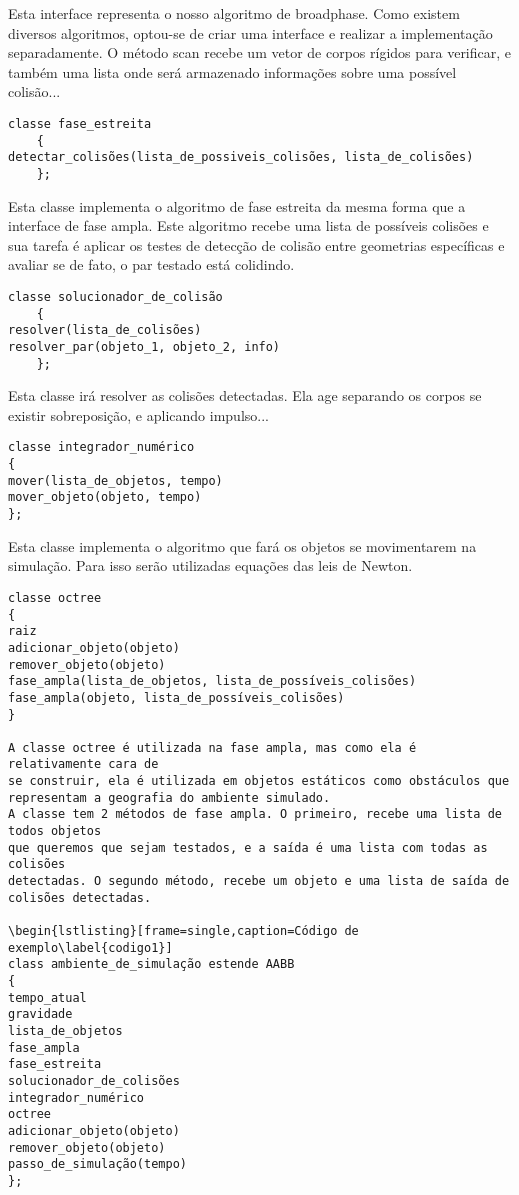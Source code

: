 Esta interface representa o nosso algoritmo de broadphase. Como existem
diversos algoritmos, optou-se de criar uma interface e realizar a implementação
separadamente.
O método scan recebe um vetor de corpos rígidos para verificar, e também uma
lista onde será armazenado informações sobre uma possível colisão...

\begin{lstlisting}[frame=single,caption=Código de exemplo\label{codigo1}]
classe fase_estreita
    {
detectar_colisões(lista_de_possiveis_colisões, lista_de_colisões)
    };
\end{lstlisting}

Esta classe implementa o algoritmo de fase estreita da mesma forma que a interface
de fase ampla. Este algoritmo recebe uma lista de possíveis colisões e sua
tarefa é aplicar os testes de detecção de colisão entre geometrias específicas
e avaliar se de fato, o par testado está colidindo.

\begin{lstlisting}[frame=single,caption=Código de exemplo\label{codigo1}]
classe solucionador_de_colisão
    {
resolver(lista_de_colisões)
resolver_par(objeto_1, objeto_2, info)
    };
\end{lstlisting}

Esta classe irá resolver as colisões detectadas. Ela age separando os corpos se
existir sobreposição, e aplicando impulso...

\begin{lstlisting}[frame=single,caption=Código de exemplo\label{codigo1}]
classe integrador_numérico
{
mover(lista_de_objetos, tempo)
mover_objeto(objeto, tempo)
};
\end{lstlisting}

 Esta classe implementa o algoritmo que fará os objetos se movimentarem na simulação. Para isso serão utilizadas equações das leis de Newton.

\begin{lstlisting}[frame=single,caption=Código de exemplo\label{codigo1}]
classe octree
{
raiz
adicionar_objeto(objeto)
remover_objeto(objeto)
fase_ampla(lista_de_objetos, lista_de_possíveis_colisões)
fase_ampla(objeto, lista_de_possíveis_colisões)
}

A classe octree é utilizada na fase ampla, mas como ela é relativamente cara de
se construir, ela é utilizada em objetos estáticos como obstáculos que representam a geografia do ambiente simulado.
A classe tem 2 métodos de fase ampla. O primeiro, recebe uma lista de todos objetos
que queremos que sejam testados, e a saída é uma lista com todas as colisões
detectadas. O segundo método, recebe um objeto e uma lista de saída de colisões detectadas.

\begin{lstlisting}[frame=single,caption=Código de exemplo\label{codigo1}]
class ambiente_de_simulação estende AABB
{
tempo_atual
gravidade
lista_de_objetos
fase_ampla
fase_estreita
solucionador_de_colisões
integrador_numérico
octree
adicionar_objeto(objeto)
remover_objeto(objeto)
passo_de_simulação(tempo)
};
\end{lstlisting}

